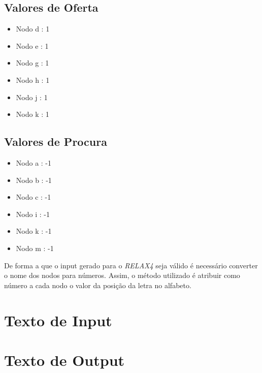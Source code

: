 \documentclass[a4paper]{report}
\begin{document}
\subsection{Valores de Oferta}
\begin{itemize}
    \item Nodo d : 1
    \item Nodo e : 1
    \item Nodo g : 1
    \item Nodo h : 1
    \item Nodo j : 1
    \item Nodo k : 1
\end{itemize}

\subsection{Valores de Procura}
\begin{itemize}
    \item Nodo a : -1
    \item Nodo b : -1
    \item Nodo c : -1
    \item Nodo i : -1
    \item Nodo k : -1
    \item Nodo m : -1
\end{itemize}
De forma a que o input gerado para o \textit{RELAX4} seja válido é necessário
converter o nome dos nodos para números. Assim, o método utilizado é atribuir
como número a cada nodo o valor da posição da letra no alfabeto.


\pagebreak
\section{Texto de Input}
\label{input}


\pagebreak
\section{Texto de Output}
\label{input}


\pagebreak
\end{document}
